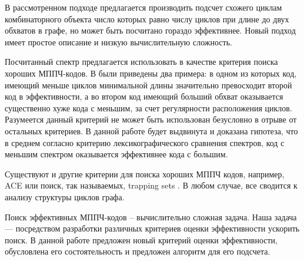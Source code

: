 В рассмотренном подходе предлагается производить подсчет схожего циклам комбинаторного объекта
число которых равно числу циклов при длине до двух обхватов в графе, но может быть посчитано гораздо эффективнее.
Новый подход имеет простое описание и низкую вычислительную сложность.

Посчитанный спектр предлагается использовать в качестве критерия поиска хороших МППЧ-кодов.
В \cite{algorithm-for-counting-for-counting-short-cycles-in-bipartite-graphs} были приведены два примера:
в одном из которых код, имеющий меньше циклов минимальной длины значительно превосходит второй код в
эффективности, а во
втором код имеющий больший обхват оказывается существенно хуже кода с меньшим, за счет регулярности
расположения циклов. Разумеется данный критерий не может быть использован безусловно
в отрыве от остальных критериев. В данной работе будет выдвинута и доказана гипотеза, что в среднем согласно
критерию лексикографического сравнения спектров, код с меньшим спектром оказывается эффективнее кода с большим.

Существуют и другие критерии для поиска хороших МППЧ кодов, например, ACE \cite{ace} или 
поиск, так называемых, trapping sets \cite{trapping-sets}. 
В любом случае, все сводится к анализу структуры циклов графа. 


Поиск эффективных МППЧ-кодов -- вычислительно сложная задача.
Наша задача --- посредством разработки различных критериев оценки эффективности ускорить поиск. 
В данной работе предложен новый критерий оценки эффективности, обусловлена его состоятельность и предложен
алгоритм для его подсчета.









































